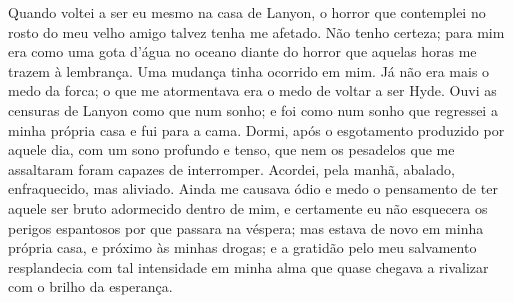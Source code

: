Quando voltei a ser eu mesmo na casa de Lanyon, o horror que contemplei
no rosto do meu velho amigo talvez tenha me afetado.  Não tenho
certeza; para mim era como uma gota d'água no oceano diante do horror
que aquelas horas me trazem à lembrança.  Uma mudança tinha ocorrido em
mim.  Já não era mais o medo da forca; o que me atormentava era o medo
de voltar a ser Hyde.  Ouvi as censuras de Lanyon como que num sonho; e
foi como num sonho que regressei a minha própria casa e fui para a
cama.  Dormi, após o esgotamento produzido por aquele dia, com um sono
profundo e tenso, que nem os pesadelos que me assaltaram foram capazes
de interromper.  Acordei, pela manhã, abalado, enfraquecido, mas
aliviado.  Ainda me causava ódio e medo o pensamento de ter aquele ser
bruto adormecido dentro de mim, e certamente eu não esquecera os
perigos espantosos por que passara na véspera; mas estava de novo em
minha própria casa, e próximo às minhas drogas; e a gratidão pelo meu
salvamento resplandecia com tal intensidade em minha alma que quase
chegava a rivalizar com o brilho da esperança.

